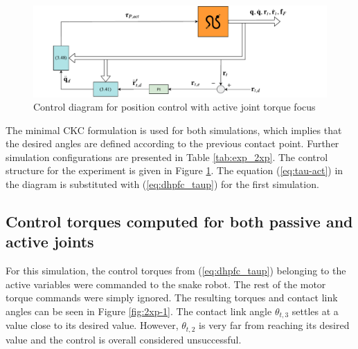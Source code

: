 \begin{figure}
    \centering
    \includegraphics[trim=1cm 0cm 3cm 0cm, clip=true, width=\textwidth]{figures/experiments/control-diagrams/2p-control-diagram.pdf}
    \caption{Control diagram for position control with active joint torque focus}
    \label{fig:diag-2p}
\end{figure}

The minimal CKC formulation is used for both simulations, which implies that the desired angles are defined according to the previous contact point. Further simulation configurations are presented in Table \ref{tab:exp_2xp}. The control structure for the experiment is given in Figure \ref{fig:diag-2p}. The equation (\ref{eq:tau-act}) in the diagram is substituted with (\ref{eq:dhpfc_taup}) for the first simulation.



\subsection{Control torques computed for both passive and active joints}

For this simulation, the control torques from (\ref{eq:dhpfc_taup}) belonging to the active variables were commanded to the snake robot. The rest of the motor torque commands were simply ignored. The resulting torques and contact link angles can be seen in Figure \ref{fig:2xp-1}. The contact link angle $\theta_{t,3}$ settles at a value close to its desired value. However, $\theta_{t,2}$ is very far from reaching its desired value and the control is overall considered unsuccessful.

